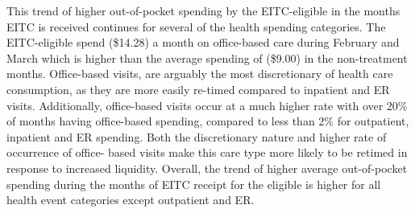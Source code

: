 \documentclass[smallcondensed,referee]{svjour3}
\begin{document}
This trend of higher out-of-pocket spending by the EITC-eligible in the months EITC is received continues for several of the health spending categories. The EITC-eligible spend (\$14.28) a month on office-based care during February and March which is higher than the average spending of (\$9.00) in the non-treatment months.  Office-based visits, are arguably the most discretionary of health care consumption, as they are more easily re-timed compared to inpatient and ER visits. Additionally, office-based visits occur at a much higher rate with over 20\% of months having office-based spending, compared to less than 2\% for outpatient, inpatient and ER spending. Both the discretionary nature and higher rate of occurrence of office- based visits make this care type more likely to be retimed in response to increased liquidity. Overall, the trend of higher average out-of-pocket spending during the months of EITC receipt for the eligible is higher for all health event categories except outpatient and ER.
\end{document}
